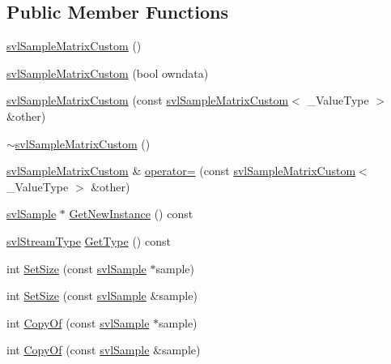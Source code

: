 \subsection*{Public Member Functions}
\begin{DoxyCompactItemize}
\item 
\hyperlink{classsvl_sample_matrix_custom_af93fe127f9a2200a85a883cdd79c339f}{svl\+Sample\+Matrix\+Custom} ()
\item 
\hyperlink{classsvl_sample_matrix_custom_a6b25e2bf233d26c294a8db847daf15db}{svl\+Sample\+Matrix\+Custom} (bool owndata)
\item 
\hyperlink{classsvl_sample_matrix_custom_a5fb16bbf9f606264fcd656cb05b624c0}{svl\+Sample\+Matrix\+Custom} (const \hyperlink{classsvl_sample_matrix_custom}{svl\+Sample\+Matrix\+Custom}$<$ \+\_\+\+Value\+Type $>$ \&other)
\item 
\hyperlink{classsvl_sample_matrix_custom_ab858d8c35f72770d4b88c2ad8234ee77}{$\sim$svl\+Sample\+Matrix\+Custom} ()
\item 
\hyperlink{classsvl_sample_matrix_custom}{svl\+Sample\+Matrix\+Custom} \& \hyperlink{classsvl_sample_matrix_custom_a45d0275e76d8db8b7ae5f9e04fe53d3c}{operator=} (const \hyperlink{classsvl_sample_matrix_custom}{svl\+Sample\+Matrix\+Custom}$<$ \+\_\+\+Value\+Type $>$ \&other)
\item 
\hyperlink{classsvl_sample}{svl\+Sample} $\ast$ \hyperlink{classsvl_sample_matrix_custom_a361e11f0bb1ba61427667bad4c2c8353}{Get\+New\+Instance} () const 
\item 
\hyperlink{svl_definitions_8h_aa00696d338a58db361335a01fd11e122}{svl\+Stream\+Type} \hyperlink{classsvl_sample_matrix_custom_a211f4990d106d1bdf38156047a663c5d}{Get\+Type} () const 
\item 
int \hyperlink{classsvl_sample_matrix_custom_a479364ea9f6b50515d3628c54c40b182}{Set\+Size} (const \hyperlink{classsvl_sample}{svl\+Sample} $\ast$sample)
\item 
int \hyperlink{classsvl_sample_matrix_custom_a2529241b6e5e4d435f4f1dcee8e106b2}{Set\+Size} (const \hyperlink{classsvl_sample}{svl\+Sample} \&sample)
\item 
int \hyperlink{classsvl_sample_matrix_custom_ad76eee163ff3bc6d77b6a0d548ddd8c0}{Copy\+Of} (const \hyperlink{classsvl_sample}{svl\+Sample} $\ast$sample)
\item 
int \hyperlink{classsvl_sample_matrix_custom_abc85e5b6f11cd06e168716fc61847238}{Copy\+Of} (const \hyperlink{classsvl_sample}{svl\+Sample} \&sample)
\item 

\end{DoxyCompactItemize}
